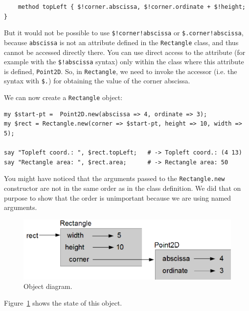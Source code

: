 \begin{verbatim}
    method topLeft { $!corner.abscissa, $!corner.ordinate + $!height; }
\end{verbatim}

But it would not be possible to use \verb'$!corner!abscissa' or 
\verb'$.corner!abscissa', because {\tt abscissa} is not an 
attribute defined in the {\tt Rectangle} class, and thus cannot 
be accessed directly there. You can use direct access 
to the attribute (for example with the \verb'$!abscissa' syntax) 
only within the class where this attribute is defined, 
{\tt Point2D}. So, in {\tt Rectangle}, we need to invoke the 
accessor (i.e. the syntax with \verb'$.') for obtaining the 
value of the corner abscissa.

We can now create a {\tt Rectangle} object:

\begin{verbatim}
my $start-pt =  Point2D.new(abscissa => 4, ordinate => 3);
my $rect = Rectangle.new(corner => $start-pt, height => 10, width => 5);

say "Topleft coord.: ", $rect.topLeft;   # -> Topleft coord.: (4 13)
say "Rectangle area: ", $rect.area;      # -> Rectangle area: 50
\end{verbatim}

You might have noticed that the arguments passed to the 
{\tt Rectangle.new} constructor are not in the same order as 
in the class definition. We did that on purpose 
to show that the order is unimportant because we 
are using named arguments.


\begin{figure}
\centerline
{\includegraphics[scale=0.8]{figs/rectangle.png}}
\caption{Object diagram.}
\label{fig.rectangle}
\end{figure}


Figure~\ref{fig.rectangle} shows the state of this object.



